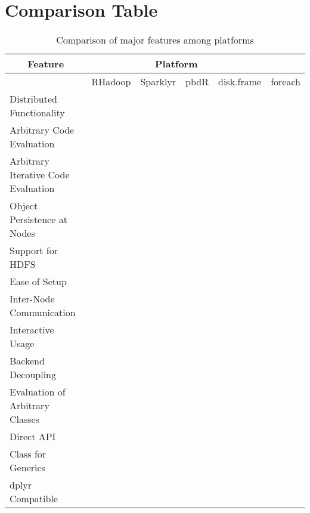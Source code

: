 \documentclass[a4paper,10pt]{article}
\begin{document}
\section{Comparison Table}\label{sec:comp-tab}

\begin{table}[h]
	\begin{tabular}{@{}llllll@{}}
		\toprule
		\multicolumn{1}{c}{Feature}         & \multicolumn{4}{c}{Platform} &                                        \\ \midrule
		                                    & RHadoop                      & Sparklyr & pbdR & disk.frame & foreach \\ \cmidrule(l){2-6}
		Distributed Functionality           &                              &          &      &            &         \\
		Arbitrary Code Evaluation           &                              &          &      &            &         \\
		Arbitrary Iterative Code Evaluation &                              &          &      &            &         \\
		Object Persistence at Nodes         &                              &          &      &            &         \\
		Support for HDFS                    &                              &          &      &            &         \\
		Ease of Setup                       &                              &          &      &            &         \\
		Inter-Node Communication            &                              &          &      &            &         \\
		Interactive Usage                   &                              &          &      &            &         \\
		Backend Decoupling                  &                              &          &      &            &         \\
		Evaluation of Arbitrary Classes     &                              &          &      &            &         \\
		Direct API                          &                              &          &      &            &         \\
		Class for Generics                  &                              &          &      &            &         \\
		dplyr Compatible                    &                              &          &      &            &         \\ \bottomrule
	\end{tabular}
	\caption{Comparison of major features among platforms\label{tab:compare-features}}
\end{table}

\printbibliography{}
\end{document}
